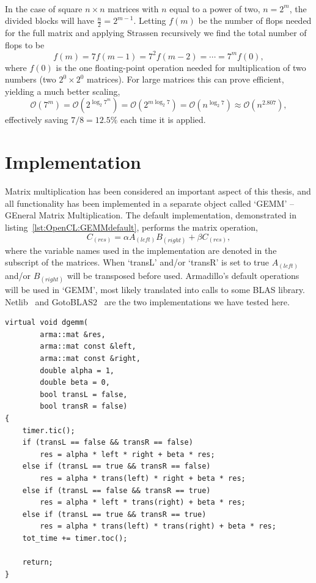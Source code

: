 \paragraph{}
In the case of square $n\times n$ matrices with $n$ equal to a power of two, $n=2^m$, the divided blocks will have $\frac{n}{2} = 2^{m-1}$.
Letting $f(m)$ be the number of flops needed for the full matrix and applying Strassen recursively we find the total number of flops to be
\begin{equation}
f(m) = 7 f(m-1) = 7^2 f(m-2) = \cdots = 7^m f(0) , 
\end{equation}
where $f(0)$ is the one floating-point operation needed for multiplication of two numbers (two $2^0\times 2^0$ matrices).
For large matrices this can prove efficient, yielding a much better scaling, 
\begin{equation}
\mathcal{O}\left( 7^m \right) = 
\mathcal{O}\left( 2^{\log_2 7^m} \right) = 
\mathcal{O}\left( 2^{m \log_2 7} \right) = 
\mathcal{O}\left( n^{\log_2 7} \right) \approx
\mathcal{O}\left( n^{2.807} \right) ,
\end{equation}
effectively saving $7/8 = 12.5\%$ each time it is applied.






\section{Implementation}
Matrix multiplication has been considered an important aspect of this thesis, and all functionality has been implemented in a separate object called `GEMM' -- GEneral Matrix Multiplication.
The default implementation, demonstrated in listing~\ref{lst:OpenCL:GEMMdefault}, performs the matrix operation, 
\begin{equation}
C_{(res)} = \alpha A_{(left)} B_{(right)} + \beta C_{(res)} , 
\end{equation}
where the variable names used in the implementation are denoted in the subscript of the matrices.
When `transL' and/or `transR' is set to true $A_{(left)}$ and/or $B_{(right)}$ will be transposed before used.
Armadillo's default operations will be used in `GEMM', most likely translated into calls to some BLAS library.
Netlib~\cite{netlibblas} and GotoBLAS2~\cite{Goto:2008:HIL:1377603.1377607} are the two implementations we have tested here.
\begin{lstlisting}[float,label={lst:OpenCL:GEMMdefault},caption={GEMM default implementation.}]
virtual void dgemm(
        arma::mat &res,
        arma::mat const &left,
        arma::mat const &right,
        double alpha = 1,
        double beta = 0,
        bool transL = false,
        bool transR = false)
{
    timer.tic();
    if (transL == false && transR == false)
        res = alpha * left * right + beta * res;
    else if (transL == true && transR == false)
        res = alpha * trans(left) * right + beta * res;
    else if (transL == false && transR == true)
        res = alpha * left * trans(right) + beta * res;
    else if (transL == true && transR == true)
        res = alpha * trans(left) * trans(right) + beta * res;
    tot_time += timer.toc();

    return;
}
\end{lstlisting}

